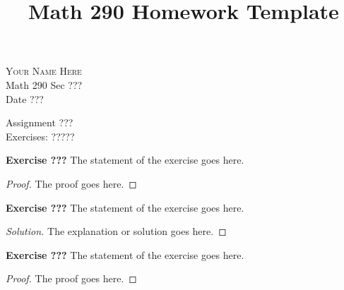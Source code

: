 \documentclass[12pt,oneside]{article}
\newenvironment{exercise}[1]{\vspace{.1in}\noindent\textbf{Exercise #1 \hspace{.05em}}}{}
\begin{document}
\title{Math 290 Homework Template}

\begin{flushright}
\textsc{Your Name Here}  \\
Math 290 Sec ???\\
Date ???
\end{flushright}

\begin{center}
\textsf{Assignment ???} \\
\textsf{Exercises: ?????}
\end{center}


\begin{exercise}{???}
The statement of the exercise goes here.
\end{exercise}

\begin{proof}
The proof goes here.
\end{proof}



\begin{exercise}{???}
The statement of the exercise goes here.
\end{exercise}

\begin{proof}[Solution]
The explanation or solution goes here.
\end{proof}



\begin{exercise}{???}
The statement of the exercise goes here.
\end{exercise}

\begin{proof}
The proof goes here.
\end{proof}


\end{document}
